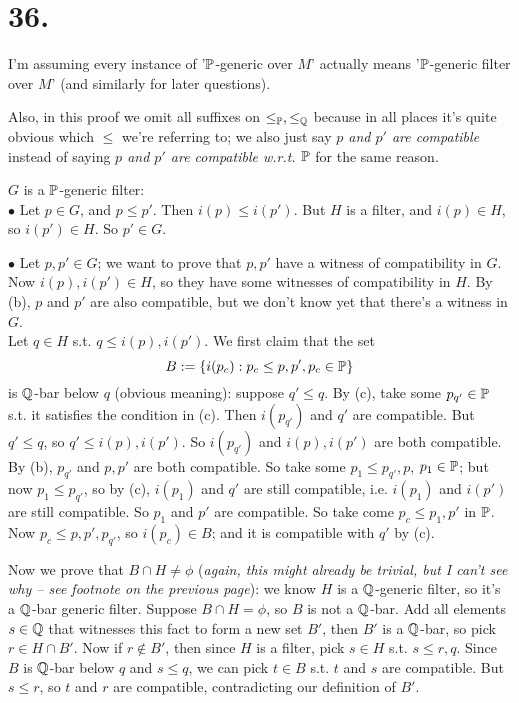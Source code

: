 \documentclass[a4paper]{article}
\begin{document}
\section*{36.}
I'm assuming every instance of '$\P$-generic over $M$' actually means '$\P$-generic filter over $M$' (and similarly for later questions).

Also, in this proof we omit all suffixes on $\leq_\P,\leq_\Q$ because in all places it's quite obvious which $\leq$ we're referring to; we also just say \emph{$p$ and $p'$ are compatible} instead of saying \emph{$p$ and $p'$ are compatible w.r.t. $\P$} for the same reason.

$G$ is a $\P$-generic filter:\\
$\bullet$ Let $p \in G$, and $p \leq p'$. Then $i(p) \leq i(p')$. But $H$ is a filter, and $i(p) \in H$, so $i(p') \in H$. So $p' \in G$.

$\bullet$ Let $p,p' \in G$; we want to prove that $p,p'$ have a witness of compatibility in $G$. Now $i(p),i(p') \in H$, so they have some witnesses of compatibility in $H$. By (b), $p$ and $p'$ are also compatible, but we don't know yet that there's a witness in $G$.\\
Let $q \in H$ s.t. $q \leq i(p),i(p')$. We first claim that the set
\[
B:=\{i(p_c): p_c \leq p,p', p_c \in \P\}
\]
is $\Q$-bar below $q$ (obvious meaning): suppose $q' \leq q$. By (c), take some $p_{q'} \in \P$ s.t. it satisfies the condition in (c). Then $i(p_{q'
})$ and $q'$ are compatible. But $q' \leq q$, so $q' \leq i(p),i(p')$. So $i(p_{q'})$ and $i(p),i(p')$ are both compatible. By (b), $p_{q'}$ and $p,p'$ are both compatible. So take some $p_1 \leq p_{q'},p$, $p_1 \in \P$; but now $p_1 \leq p_{q'}$, so by (c), $i(p_1)$ and $q'$ are still compatible, i.e. $i(p_1)$ and $i(p')$ are still compatible. So $p_1$ and $p'$ are compatible. So take come $p_c \leq p_1,p'$ in $\P$. Now $p_c \leq p,p',p_{q'}$, so $i(p_c) \in B$; and it is compatible with $q'$ by (c).

Now we prove that $B\cap H \neq \phi$ (\emph{again, this might already be trivial, but I can't see why -- see footnote on the previous page}): we know $H$ is a $\Q$-generic filter, so it's a $\Q$-bar generic filter. Suppose $B \cap H = \phi$, so $B$ is not a $\Q$-bar. Add all elements $s \in \Q$ that witnesses this fact to form a new set $B'$, then $B'$ is a $\Q$-bar, so pick $r \in H \cap B'$. Now if $r \not\in B'$, then since $H$ is a filter, pick $s \in H$ s.t. $s \leq r,q$. Since $B$ is $\Q$-bar below $q$ and $s \leq q$, we can pick $t \in B$ s.t. $t$ and $s$ are compatible. But $s \leq r$, so $t$ and $r$ are compatible, contradicting our definition of $B'$.
\end{document}
